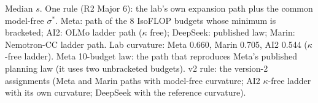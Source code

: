 \begin{table}[tp]
\centering
\caption{Lab-Own Technologies under One Rule}
\label{tab:app-labown}
\footnotesize
\setlength{\tabcolsep}{3pt}
\medskip
\begin{tablenotes}
Median $s$. One rule (R2 Major 6): the lab's own expansion path plus the common model-free $\sigma^*$. Meta: path of the 8 IsoFLOP budgets whose minimum is bracketed; AI2: OLMo ladder path ($\kappa$ free); DeepSeek: published law; Marin: Nemotron-CC ladder path. Lab curvature: Meta 0.660, Marin 0.705, AI2 0.544 ($\kappa$-free ladder). Meta 10-budget law: the path that reproduces Meta's published planning law (it uses two unbracketed budgets). v2 rule: the version-2 assignments (Meta and Marin paths with model-free curvature; AI2 $\kappa$-free ladder with its own curvature; DeepSeek with the reference curvature).
\end{tablenotes}
\end{table}
